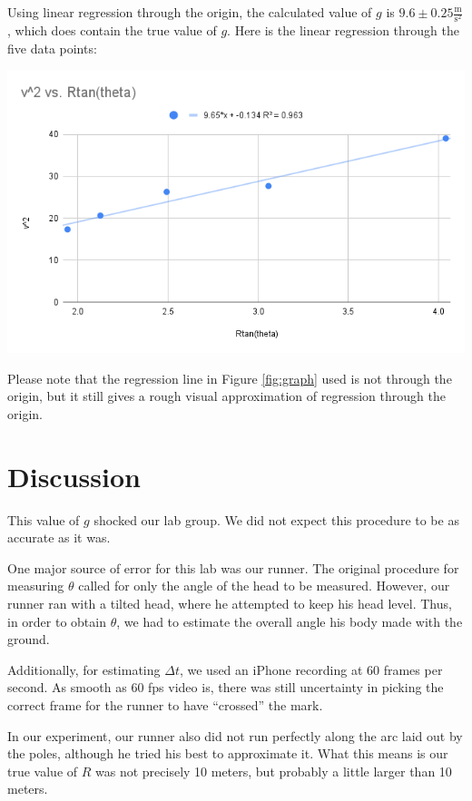 \documentclass[12pt]{article}
\begin{document}
Using linear regression through the origin, the calculated value of \(g\) is \(9.6 \pm 0.25 \frac{\text{m}}{\text{s}^{2}}\), which does contain the true value of \(g\). Here is the linear regression through the five data points:

\begin{center}
\includegraphics[width=6.5in]{./chart.png}
\end{center}

Please note that the regression line in Figure \ref{fig:graph} used is not through the origin, but it still gives a rough visual approximation of regression through the origin.
\section{Discussion}
\label{sec:org24241b1}

This value of \(g\) shocked our lab group. We did not expect this procedure to be as accurate as it was.

One major source of error for this lab was our runner. The original procedure for measuring \(\theta\) called for only the angle of the head to be measured. However, our runner ran with a tilted head, where he attempted to keep his head level. Thus, in order to obtain \(\theta\), we had to estimate the overall angle his body made with the ground.

Additionally, for estimating \(\Delta t\), we used an iPhone recording at 60 frames per second. As smooth as 60 fps video is, there was still uncertainty in picking the correct frame for the runner to have ``crossed'' the mark.

In our experiment, our runner also did not run perfectly along the arc laid out by the poles, although he tried his best to approximate it. What this means is our true value of \(R\) was not precisely 10 meters, but probably a little larger than 10 meters.
\end{document}
